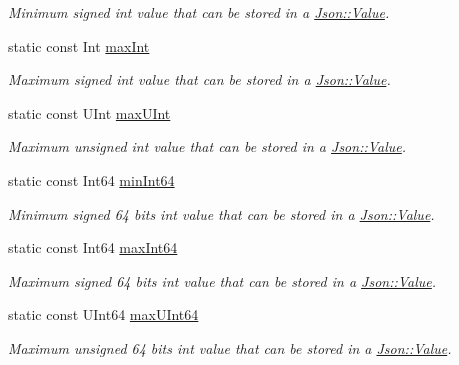 \begin{DoxyCompactItemize}
\begin{DoxyCompactList}\small\item\em Minimum signed int value that can be stored in a \mbox{\hyperlink{class_json_1_1_value}{Json\+::\+Value}}. \end{DoxyCompactList}\item 
\mbox{\label{class_json_1_1_value_a978c799a8af3114ef7dab6fd0a310a1b}} 
static const Int \mbox{\hyperlink{class_json_1_1_value_a978c799a8af3114ef7dab6fd0a310a1b}{max\+Int}}
\begin{DoxyCompactList}\small\item\em Maximum signed int value that can be stored in a \mbox{\hyperlink{class_json_1_1_value}{Json\+::\+Value}}. \end{DoxyCompactList}\item 
\mbox{\label{class_json_1_1_value_ac79e63ee68d3aa914bfd6988be669b87}} 
static const U\+Int \mbox{\hyperlink{class_json_1_1_value_ac79e63ee68d3aa914bfd6988be669b87}{max\+U\+Int}}
\begin{DoxyCompactList}\small\item\em Maximum unsigned int value that can be stored in a \mbox{\hyperlink{class_json_1_1_value}{Json\+::\+Value}}. \end{DoxyCompactList}\item 
\mbox{\label{class_json_1_1_value_a815ef899bc312c93bc426511acfe31a7}} 
static const Int64 \mbox{\hyperlink{class_json_1_1_value_a815ef899bc312c93bc426511acfe31a7}{min\+Int64}}
\begin{DoxyCompactList}\small\item\em Minimum signed 64 bits int value that can be stored in a \mbox{\hyperlink{class_json_1_1_value}{Json\+::\+Value}}. \end{DoxyCompactList}\item 
\mbox{\label{class_json_1_1_value_a4492634870b8c5709ce967b384ac6006}} 
static const Int64 \mbox{\hyperlink{class_json_1_1_value_a4492634870b8c5709ce967b384ac6006}{max\+Int64}}
\begin{DoxyCompactList}\small\item\em Maximum signed 64 bits int value that can be stored in a \mbox{\hyperlink{class_json_1_1_value}{Json\+::\+Value}}. \end{DoxyCompactList}\item 
\mbox{\label{class_json_1_1_value_ae1eb89c305c39516696ff305cffa01da}} 
static const U\+Int64 \mbox{\hyperlink{class_json_1_1_value_ae1eb89c305c39516696ff305cffa01da}{max\+U\+Int64}}
\begin{DoxyCompactList}\small\item\em Maximum unsigned 64 bits int value that can be stored in a \mbox{\hyperlink{class_json_1_1_value}{Json\+::\+Value}}. \end{DoxyCompactList}\end{DoxyCompactItemize}
